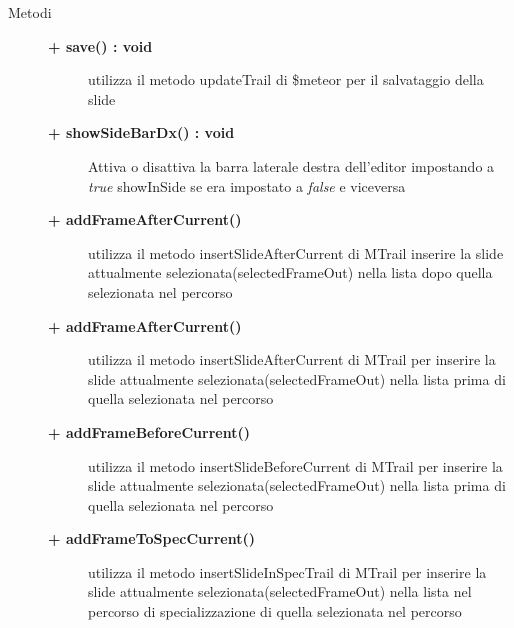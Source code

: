 \begin{description}
	
\item[Metodi] \hfill

	\begin{description}
		\item[\textbf{\color{blue}+ save() : void			}] \hfill
			utilizza il metodo updateTrail di \$meteor per il salvataggio della slide
	\end{description}
	
	\begin{description}
		\item[\textbf{\color{blue}+ showSideBarDx() : void			}] \hfill
			Attiva o disattiva la barra laterale destra dell'editor impostando a \textit{true} showInSide se era impostato a \textit{false} e viceversa
	\end{description}
	
	\begin{description}
		\item[\textbf{\color{blue}+ addFrameAfterCurrent()			}] \hfill
			utilizza il metodo insertSlideAfterCurrent di MTrail inserire la slide attualmente selezionata(selectedFrameOut) nella lista dopo quella selezionata nel percorso
	\end{description}
	
	\begin{description}
		\item[\textbf{\color{blue}+ addFrameAfterCurrent()			}] \hfill
			utilizza il metodo insertSlideAfterCurrent di MTrail per inserire la slide attualmente selezionata(selectedFrameOut) nella lista prima di quella selezionata nel percorso
	\end{description}
	
	\begin{description}
		\item[\textbf{\color{blue}+ addFrameBeforeCurrent()			}] \hfill
			utilizza il metodo insertSlideBeforeCurrent di MTrail per inserire la slide attualmente selezionata(selectedFrameOut) nella lista prima di quella selezionata nel percorso
	\end{description}
	
	\begin{description}
		\item[\textbf{\color{blue}+ addFrameToSpecCurrent()			}] \hfill
			utilizza il metodo insertSlideInSpecTrail di MTrail per inserire la slide attualmente selezionata(selectedFrameOut) nella lista nel percorso di specializzazione di quella selezionata nel percorso
	\end{description}
	

\end{description}
